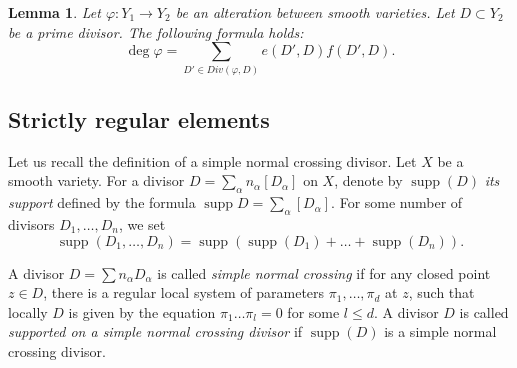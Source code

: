 \documentclass[12pt]{extarticle}
\newtheorem{lemma}[theorem]{Lemma}
\def\mb{\mathbb}
\def\k{\mb K}
\def\ph{\varphi}
\def\wdw{\wedge\dots\wedge}
\DeclareMathOperator{\supp}{supp}
\begin{document}
\begin{lemma}
\label{lemma:degree_is_a_sum_multiplicties}
    Let $\ph\colon Y_1\to Y_2$ be an alteration between smooth varieties. Let $D\subset Y_2$ be a prime divisor. The following formula holds:  
    $$\deg \varphi = \sum\limits_{D'\in Div(\ph, D)}e(D', D)f(D', D).$$
\end{lemma}
\subsection{Strictly regular elements}
Let us recall the definition of a simple normal crossing divisor.
Let $X$ be a smooth variety. For a divisor $D=\sum\limits_{\alpha}n_\alpha[D_\alpha]$ on $X$, denote by $\supp(D)$ \emph{its support} defined by the formula $\supp D=\sum\limits_{\alpha} [D_\alpha]$.  For some number of divisors $D_1,\dots, D_n$, we set $$\supp(D_1,\dots, D_n)=\supp(\supp(D_1)+\dots+\supp(D_n)).$$ 

A divisor $D=\sum n_\alpha D_\alpha$ is called \emph{ simple normal crossing} if for any closed point $z\in D$,  there is a regular local system of parameters $\pi_1,\dots, \pi_d$ at $z$, such that locally $D$ is given by the equation $\pi_1\dots \pi_l=0$ for some $l\leq d$.
A divisor $D$ is called \emph{supported on a simple normal crossing divisor} if $\supp(D)$ is a simple normal crossing divisor.  %



\end{document}

